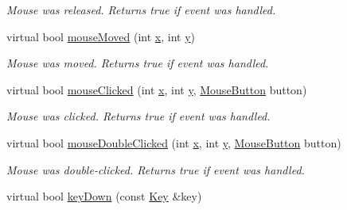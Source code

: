 \begin{DoxyCompactItemize}
\begin{DoxyCompactList}\small\item\em Mouse was released. Returns true if event was handled. \end{DoxyCompactList}\item 
\hypertarget{classGUI_1_1WindowInWindow_af278696e6a9012213d67112aaf1dcfe8}{virtual bool \hyperlink{classGUI_1_1WindowInWindow_af278696e6a9012213d67112aaf1dcfe8}{mouse\-Moved} (int \hyperlink{classGUI_1_1Window_a6ca6a80ca00c9e1d8ceea8d3d99a657d}{x}, int \hyperlink{classGUI_1_1Window_a0ee8e923aff2c3661fc2e17656d37adf}{y})}\label{classGUI_1_1WindowInWindow_af278696e6a9012213d67112aaf1dcfe8}

\begin{DoxyCompactList}\small\item\em Mouse was moved. Returns true if event was handled. \end{DoxyCompactList}\item 
virtual bool \hyperlink{classGUI_1_1WindowInWindow_a2ed086150348b1fcf9564997185b76a4}{mouse\-Clicked} (int \hyperlink{classGUI_1_1Window_a6ca6a80ca00c9e1d8ceea8d3d99a657d}{x}, int \hyperlink{classGUI_1_1Window_a0ee8e923aff2c3661fc2e17656d37adf}{y}, \hyperlink{namespaceGUI_ad06082a7b02aa73697f39eb8e0856de9}{Mouse\-Button} button)
\begin{DoxyCompactList}\small\item\em Mouse was clicked. Returns true if event was handled. \end{DoxyCompactList}\item 
\hypertarget{classGUI_1_1WindowInWindow_ac2c184d3cad01f199019a72963db36c0}{virtual bool \hyperlink{classGUI_1_1WindowInWindow_ac2c184d3cad01f199019a72963db36c0}{mouse\-Double\-Clicked} (int \hyperlink{classGUI_1_1Window_a6ca6a80ca00c9e1d8ceea8d3d99a657d}{x}, int \hyperlink{classGUI_1_1Window_a0ee8e923aff2c3661fc2e17656d37adf}{y}, \hyperlink{namespaceGUI_ad06082a7b02aa73697f39eb8e0856de9}{Mouse\-Button} button)}\label{classGUI_1_1WindowInWindow_ac2c184d3cad01f199019a72963db36c0}

\begin{DoxyCompactList}\small\item\em Mouse was double-\/clicked. Returns true if event was handled. \end{DoxyCompactList}\item 
\hypertarget{classGUI_1_1WindowInWindow_a9c0dea9151658aa843187712c279458e}{virtual bool \hyperlink{classGUI_1_1WindowInWindow_a9c0dea9151658aa843187712c279458e}{key\-Down} (const \hyperlink{classGUI_1_1Key}{Key} \&key)}\label{classGUI_1_1WindowInWindow_a9c0dea9151658aa843187712c279458e}


\end{DoxyCompactItemize}
